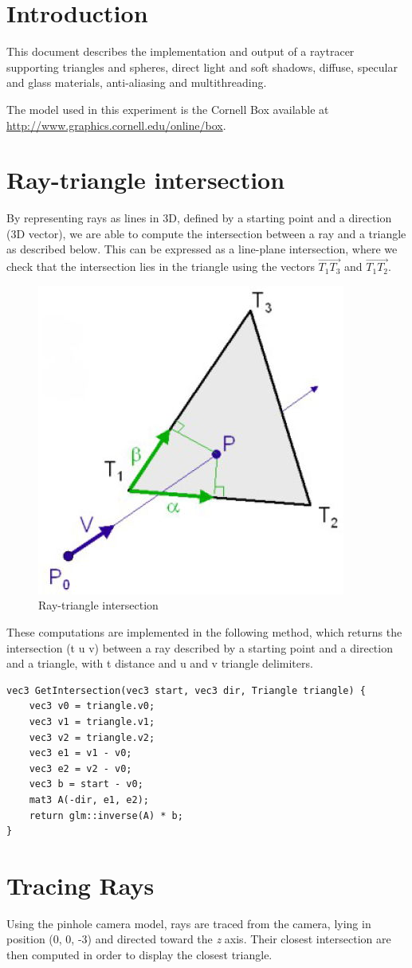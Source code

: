 \section*{Introduction}
This document describes the implementation and output of a raytracer supporting triangles and spheres, direct light and soft shadows, diffuse, specular and glass materials, anti-aliasing and multithreading.

The model used in this experiment is the Cornell Box available at \url{http://www.graphics.cornell.edu/online/box}.

\setcounter{section}{0}

\section{Ray-triangle intersection}
By representing rays as lines in 3D, defined by a starting point and a direction (3D vector), we are able to compute the intersection between a ray and a triangle as described below.
This can be expressed as a line-plane intersection, where we check that the intersection lies in the triangle using the vectors $\vec{T_1T_3}$ and $\vec{T_1T_2}$.

\begin{figure}[H]
\centering
\includegraphics[width=0.2\linewidth]{img/ray.jpg}
\caption{Ray-triangle intersection}
\end{figure}

These computations are implemented in the following method, which returns the intersection (t u v) between a ray described by a starting point and a direction and a triangle, with t distance and u and v triangle delimiters.
\begin{lstlisting}
vec3 GetIntersection(vec3 start, vec3 dir, Triangle triangle) {
	vec3 v0 = triangle.v0;
	vec3 v1 = triangle.v1;
	vec3 v2 = triangle.v2;
	vec3 e1 = v1 - v0;
	vec3 e2 = v2 - v0;
	vec3 b = start - v0;
	mat3 A(-dir, e1, e2);
	return glm::inverse(A) * b;
}
\end{lstlisting}


\section{Tracing Rays}
Using the pinhole camera model, rays are traced from the camera, lying in position (0, 0, -3) and directed toward the \textit{z} axis. Their closest intersection are then computed in order to display the closest triangle.

